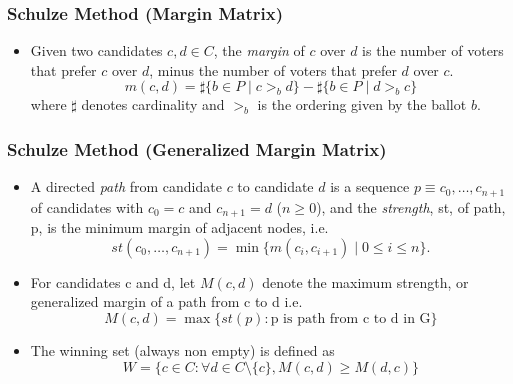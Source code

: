 \documentclass{beamer}
\begin{document}
\begin{frame}
\frametitle{Schulze Method (Margin Matrix)}
\begin{itemize}

\item Given two candidates $c, d \in C$,
the \emph{margin} of $c$ over $d$ is
the number of voters that prefer $c$ over $d$, minus the number of voters that prefer $d$ over $c$. 
\[
  m(c, d) = \sharp \lbrace b \in P \mid c >_b d \rbrace -
            \sharp \lbrace b \in P \mid d >_b c \rbrace
\] where $\sharp$ denotes cardinality and $>_b$ is the 
ordering given by the ballot $b$.
\end{itemize}
\end{frame}



\begin{frame}
\frametitle{Schulze Method (Generalized Margin Matrix)}
\begin{itemize}

\item A directed \emph{path} from
candidate $c$ to candidate $d$ is a sequence $p \equiv c_0, \dots, c_{n+1}$
of candidates with $c_0 = c$ and $c_{n+1} = d$ ($n \geq 0$), and the
\emph{strength}, st, of path, p, is the minimum margin of adjacent
nodes, i.e.
\[ st(c_0, \dots, c_{n+1}) = \min \lbrace m (c_i, c_{i+1}) \mid 0
\leq i \leq n \rbrace. \]\pause
\item For candidates c and d, let $M(c, d)$ denote the maximum strength, or generalized margin of a path
	from c to d i.e. 
	\[ M(c, d) = \max \lbrace st (p) : \text{p is path from c to d in G} \rbrace\]\pause
	
\item The winning set (always non empty) is defined as 
 \[ W =  \lbrace c \in C : \forall d \in C \setminus \{c\}, M (c, d) \geq M (d, c) \rbrace\]

\end{itemize}
\end{frame}
\end{document}
